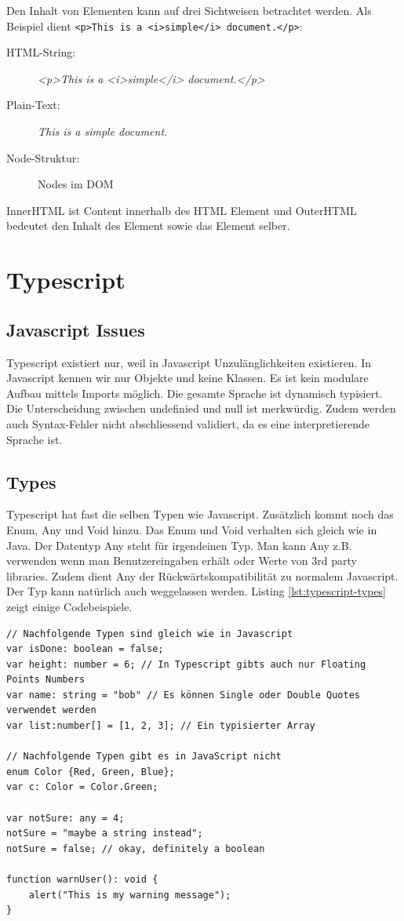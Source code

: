 Den Inhalt von Elementen kann auf drei Sichtweisen betrachtet werden. Als Beispiel dient \lstinline|<p>This is a <i>simple</i> document.</p>|:
\begin{description}
	\item[HTML-String:] \textit{<p>This is a <i>simple</i> document.</p>}
	\item[Plain-Text:] \textit{This is a simple document.}
	\item[Node-Struktur:] Nodes im DOM
\end{description}
InnerHTML ist Content innerhalb des HTML Element und OuterHTML bedeutet den Inhalt des Element sowie das Element selber.

\section{Typescript}

\subsection{Javascript Issues}
Typescript existiert nur, weil in Javascript Unzulänglichkeiten existieren. In Javascript kennen wir nur Objekte und keine Klassen. Es ist kein modulare Aufbau mittels Imports möglich. Die gesamte Sprache ist dynamisch typisiert. Die Unterscheidung zwischen undefinied und null ist merkwürdig. Zudem werden auch Syntax-Fehler nicht abschliessend validiert, da es eine interpretierende Sprache ist.

\subsection{Types}
Typescript hat fast die selben Typen wie Javascript. Zusätzlich kommt noch das Enum, Any und Void hinzu. Das Enum und Void verhalten sich gleich wie in Java. Der Datentyp Any steht für irgendeinen Typ. Man kann Any z.B. verwenden wenn man Benutzereingaben erhält oder Werte von 3rd party libraries. Zudem dient Any der Rückwärtskompatibilität zu normalem Javascript. Der Typ kann natürlich auch weggelassen werden. Listing \ref{lst:typescript-types} zeigt einige Codebeispiele.

\begin{lstlisting}[label=lst:typescript-types,caption=Types]
// Nachfolgende Typen sind gleich wie in Javascript
var isDone: boolean = false;
var height: number = 6; // In Typescript gibts auch nur Floating Points Numbers
var name: string = "bob" // Es können Single oder Double Quotes verwendet werden
var list:number[] = [1, 2, 3]; // Ein typisierter Array

// Nachfolgende Typen gibt es in JavaScript nicht
enum Color {Red, Green, Blue};
var c: Color = Color.Green;

var notSure: any = 4;
notSure = "maybe a string instead";
notSure = false; // okay, definitely a boolean

function warnUser(): void {
	alert("This is my warning message");
}
\end{lstlisting}

